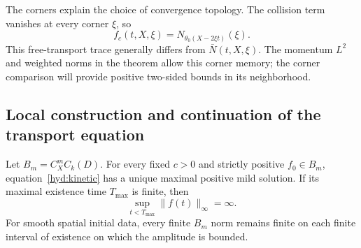 The corners explain the choice of convergence topology. The collision
term vanishes at every corner $\xi$, so
\[
 f_c(t,X,\xi)=N_{\theta_0(X-2\xi t)}(\xi).
\]
This free-transport trace generally differs from $\bar N(t,X,\xi)$.
The momentum $L^2$ and weighted norms in the theorem allow this corner
memory; the corner comparison will provide positive two-sided bounds
in its neighborhood.

\subsection{Local construction and continuation of the transport equation}
\label{hyd:local-section}

\begin{lemma}\label{hyd:local}
 Let $B_m=C_X^mC_k(D)$. For every fixed $c>0$ and strictly positive
 $f_0\in B_m$, equation~\eqref{hyd:kinetic} has a unique maximal positive
 mild solution. If its maximal existence time $T_{\max}$ is finite, then
 \[
 \sup_{t<T_{\max}}\|f(t)\|_\infty=\infty.
 \]
 For smooth spatial initial data, every finite $B_m$ norm remains finite
 on each finite interval of existence on which the amplitude is bounded.
\end{lemma}

